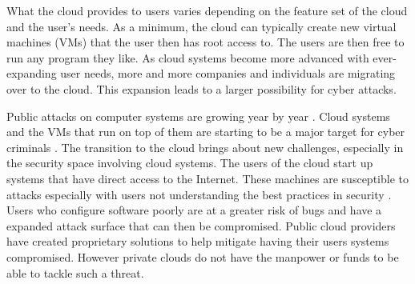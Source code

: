 \documentclass[12pt]{article}
\begin{document}
What the cloud provides to users varies depending on the feature set of the cloud and the user's needs. As a minimum, the cloud can typically create new virtual machines (VMs) that the user then has root access to. The users are then free to run any program they like. As cloud systems become more advanced with ever-expanding user needs, more and more companies and individuals are migrating over to the cloud\cite{kondo2009cost}. This expansion leads to a larger possibility for cyber attacks.

Public attacks on computer systems are growing year by year \cite{newman_2017}. Cloud systems and the VMs that run on top of them are starting to be a major target for cyber criminals \cite{kellerman}. The transition to the cloud brings about new challenges, especially in the security space involving cloud systems. The users of the cloud start up systems that have direct access to the Internet. These machines are susceptible to attacks especially with users not understanding the best practices in security \cite{ng2009studying}. Users who configure software poorly are at a greater risk of bugs and have a expanded attack surface that can then be compromised.  Public cloud providers have created proprietary solutions to help mitigate having their users systems compromised. However private clouds do not have the manpower or funds to be able to tackle such a threat.

\end{document}
